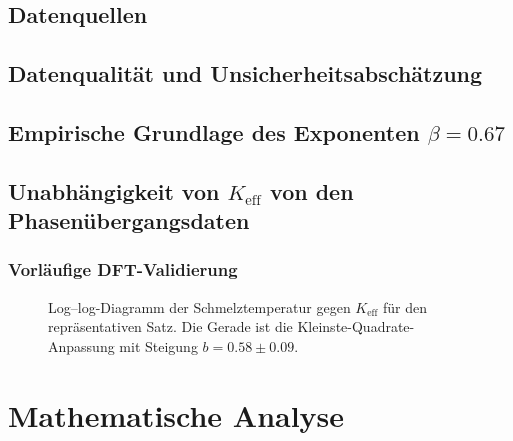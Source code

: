 \documentclass[12pt,a4paper]{article}
\theoremstyle{remark}
\begin{document}
	\subsection{Datenquellen}
	\subsection{Datenqualität und Unsicherheitsabschätzung}
	\subsection{Empirische Grundlage des Exponenten \(\beta = 0.67\)}
	\subsection{Unabhängigkeit von \(K_{\mathrm{eff}}\) von den Phasenübergangsdaten}
	\subsubsection{Vorläufige DFT-Validierung}
	
	\begin{figure}[htbp]
		\centering
		\caption{Log–log-Diagramm der Schmelztemperatur gegen \(K_{\mathrm{eff}}\) für den repräsentativen Satz. Die Gerade ist die Kleinste-Quadrate-Anpassung mit Steigung \(b = 0.58\pm0.09\).}
		\label{fig:tmelt_fit}
	\end{figure}
	
	\section{Mathematische Analyse}
\end{document}
